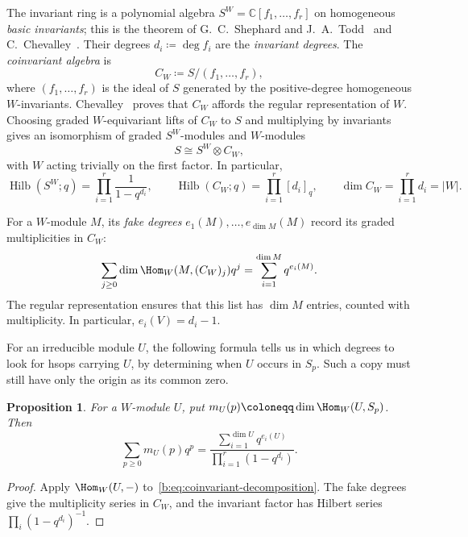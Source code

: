 \documentclass[10pt,a4paper]{amsart}
\newcommand{\defeq}{\coloneqq}
\newcommand{\defn}[1]{\emph{\color{darkblue}#1}}
\newtheorem{proposition}[theorem]{Proposition}
\theoremstyle{definition}
\newcommand{\C}{\mathbb C}\newcommand{\Q}{\mathbb Q}
\DeclareMathOperator{\Hilb}{Hilb}\DeclareMathOperator{\Res}{Res}
\begin{document}
The invariant ring is a polynomial algebra
$S^W=\C[f_1,\ldots,f_r]$ on homogeneous \defn{basic invariants}; this is
the theorem of G.~C.~Shephard and J.~A.~Todd~\cite{ST} and C.~Chevalley~\cite{Chevalley}.
Their degrees $d_i\defeq\deg f_i$ are the \defn{invariant degrees}.
The \defn{coinvariant algebra} is
\[
 C_W\defeq S/(f_1,\ldots,f_r),
\]
where $(f_1,\ldots,f_r)$ is the ideal of $S$ generated by the
positive-degree homogeneous $W$-invariants.
Chevalley~\cite{Chevalley} proves that $C_W$ affords the regular
representation of $W$. Choosing graded $W$-equivariant lifts of
$C_W$ to $S$ and multiplying by invariants gives an isomorphism
of graded $S^W$-modules and $W$-modules
\begin{equation}\label{b:eq:coinvariant-decomposition}
 S\cong S^W\otimes C_W,
\end{equation}
with $W$ acting trivially on the first factor.
In particular,
\[
 \Hilb(S^W;q)=\prod_{i=1}^r\frac1{1-q^{d_i}},\qquad
 \Hilb(C_W;q)=\prod_{i=1}^r[d_i]_q,\qquad
 \dim C_W=\prod_{i=1}^r d_i=|W|.
\]

For a $W$-module $M$, its \defn{fake degrees}
$e_1(M),\ldots,e_{\dim M}(M)$ record its graded multiplicities in $C_W$:
\[
 \sum_{j\ge0}\dim\Hom_W(M,(C_W)_j)q^j
       =\sum_{i=1}^{\dim M}q^{e_i(M)}.
\]
The regular representation ensures that this list has $\dim M$ entries,
counted with multiplicity. In particular, $e_i(V)=d_i-1$.

For an irreducible module $U$, the following formula tells us in which
degrees to look for hsops carrying $U$, by determining when $U$ occurs
in $S_p$. Such a copy must still have only the origin as its common zero.

\begin{proposition}\label{prop:hsop-multiplicity}
For a $W$-module $U$, put $m_U(p)\defeq\dim\Hom_W(U,S_p)$. Then
\[
 \sum_{p\ge0}m_U(p)q^p
 =\frac{\sum_{i=1}^{\dim U}q^{e_i(U)}}
        {\prod_{i=1}^r(1-q^{d_i})}.
\]
\end{proposition}
\begin{proof}
Apply $\Hom_W(U,-)$ to~\cref{b:eq:coinvariant-decomposition}.
The fake degrees give the multiplicity series in $C_W$, and the
invariant factor has Hilbert series $\prod_i(1-q^{d_i})^{-1}$.
\end{proof}
\end{document}
